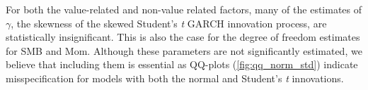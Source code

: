 For both the value-related and non-value related factors, many of the estimates of $\gamma$, the skewness of the skewed Student's \textit{t} GARCH innovation process, are statistically insignificant. This is also the case for the degree of freedom estimates for SMB and Mom. Although these parameters are not significantly estimated, we believe that including them is essential as QQ-plots (\autoref{fig:qq_norm_std}) indicate misspecification for models with both the normal and Student's \textit{t} innovations.

